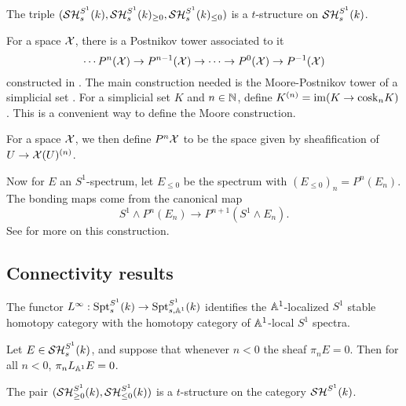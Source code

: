 \documentclass{amsart}%
\newcommand{\cosk}{\mathrm{cosk}}
\begin{document}
\begin{theorem}
  The triple
  $(\mathcal{SH}_s^{S^1}(k), \mathcal{SH}_s^{S^1}(k)_{\geq 0}, \mathcal{SH}_s^{S^1}(k)_{\leq 0})$
  is a $t$-structure on $\mathcal{SH}_s^{S^1}(k)$. 
\end{theorem}


\begin{remark}
  For a space $\mathcal{X}$, there is a Postnikov tower associated to it
  \begin{equation*}
    \cdots P^n(\mathcal{X})\to P^{n-1}(\mathcal{X}) \to \cdots \to P^{0}(\mathcal{X}) \to P^{-1}(\mathcal{X})
  \end{equation*}
  constructed in \cite[p. 57]{MV99}. The main construction needed is the
  Moore-Postnikov tower of a simplicial set \cite[VI.3.4]{GJ91}. For a
  simplicial set $K$ and $n\in\mathbb{N}$, define
  $K^{(n)} = \im ( K \to \cosk_nK)$. This is a convenient way to
  define the Moore construction. 

  For a space $\mathcal{X}$, we then define $P^{n}\mathcal{X}$ to be the space
  given by sheafification of $U \to \mathcal{X}(U)^{(n)}$.

  Now for $E$ an $S^1$-spectrum, let $E_{\leq 0}$ be the spectrum with
  $(E_{\leq 0})_n = P^n(E_n)$. The bonding maps come from the
  canonical map
  \begin{equation*}
    S^1 \wedge P^n(E_n) \to P^{n+1}(S^1 \wedge E_n).
  \end{equation*}
  See \cite[Lemma 3.2.1]{Mor05} for more on this construction.
\end{remark}

\subsection{Connectivity results}

\begin{proposition}\cite[Lemma4.2.4]{Mor03}
  The functor
  $L^{\infty} : \mathrm{Spt}^{S^1}_s(k) \to \mathrm{Spt}^{S^1}_{s,\mathbb{A}^1}(k)$
  identifies the $\mathbb{A}^1$-localized $S^1$ stable homotopy category
  with the homotopy category of $\mathbb{A}^1$-local $S^1$ spectra.
\end{proposition}

\begin{theorem}
  Let $E \in \mathcal{SH}_s^{S^1}(k)$, and suppose that whenever $n < 0$ the
  sheaf $\pi_n E = 0$. Then for all $n<0$, $\pi_n L_{\mathbb{A}^1}E = 0$.
\end{theorem}

\begin{theorem}
  The pair $(\mathcal{SH}_{\geq 0}^{S^1}(k), \mathcal{SH}_{\leq 0}^{S^1}(k))$ is a
  $t$-structure on the category $\mathcal{SH}^{S^1}(k)$. 
\end{theorem}
\end{document}
